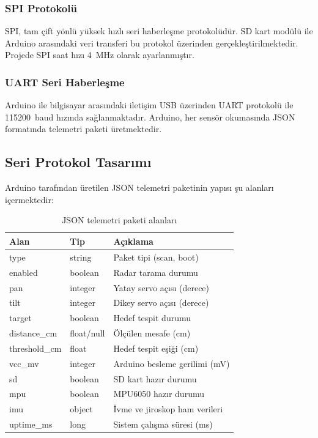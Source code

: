 \subsubsection{SPI Protokolü}

SPI, tam çift yönlü yüksek hızlı seri haberleşme protokolüdür. SD kart modülü ile Arduino arasındaki veri transferi bu protokol üzerinden gerçekleştirilmektedir. Projede SPI saat hızı 4~MHz olarak ayarlanmıştır.

\subsubsection{UART Seri Haberleşme}

Arduino ile bilgisayar arasındaki iletişim USB üzerinden UART protokolü ile 115200~baud hızında sağlanmaktadır. Arduino, her sensör okumasında JSON formatında telemetri paketi üretmektedir.

\subsection{Seri Protokol Tasarımı}

Arduino tarafından üretilen JSON telemetri paketinin yapısı şu alanları içermektedir:

\begin{table}[!ht]
    \centering
    \caption{JSON telemetri paketi alanları}
    \label{tab:telemetri}
    \begin{tabular}{|l|l|l|}
        \hline
        \textbf{Alan} & \textbf{Tip} & \textbf{Açıklama} \\
        \hline
        type & string & Paket tipi (scan, boot) \\
        \hline
        enabled & boolean & Radar tarama durumu \\
        \hline
        pan & integer & Yatay servo açısı (derece) \\
        \hline
        tilt & integer & Dikey servo açısı (derece) \\
        \hline
        target & boolean & Hedef tespit durumu \\
        \hline
        distance\_cm & float/null & Ölçülen mesafe (cm) \\
        \hline
        threshold\_cm & float & Hedef tespit eşiği (cm) \\
        \hline
        vcc\_mv & integer & Arduino besleme gerilimi (mV) \\
        \hline
        sd & boolean & SD kart hazır durumu \\
        \hline
        mpu & boolean & MPU6050 hazır durumu \\
        \hline
        imu & object & İvme ve jiroskop ham verileri \\
        \hline
        uptime\_ms & long & Sistem çalışma süresi (ms) \\
        \hline
    \end{tabular}
\end{table}

